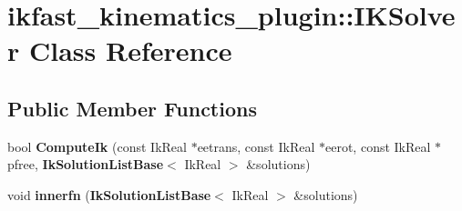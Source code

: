 \section{ikfast\-\_\-kinematics\-\_\-plugin\-:\-:I\-K\-Solver Class Reference}
\label{classikfast__kinematics__plugin_1_1_i_k_solver}
\subsection*{Public Member Functions}
\begin{DoxyCompactItemize}
\item 
bool {\bfseries Compute\-Ik} (const Ik\-Real $\ast$eetrans, const Ik\-Real $\ast$eerot, const Ik\-Real $\ast$pfree, {\bf Ik\-Solution\-List\-Base}$<$ Ik\-Real $>$ \&solutions)\label{classikfast__kinematics__plugin_1_1_i_k_solver_adfa8e4462d99161fed9f3542ce2aac1a}

\item 
void {\bfseries innerfn} ({\bf Ik\-Solution\-List\-Base}$<$ Ik\-Real $>$ \&solutions)\label{classikfast__kinematics__plugin_1_1_i_k_solver_a5ec49815b0f9588c2688285b6127a453}

\end{DoxyCompactItemize}
